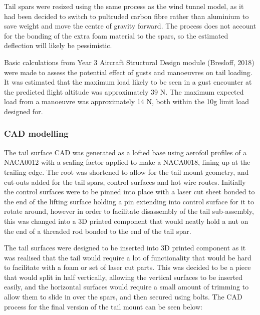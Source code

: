 \documentclass[../../main.tex]{subfiles}
\begin{document}
Tail spars were resized using the same process as the wind tunnel model, as it had been decided to switch to pultruded carbon fibre rather than aluminium to save weight and move the centre of gravity forward.
The process does not account for the bonding of the extra foam material to the spars, so the estimated deflection will likely be pessimistic.  

Basic calculations from Year 3 Aircraft Structural Design module (Bresloff, 2018) were made to assess the potential effect of gusts and manoeuvres on tail loading.
It was estimated that the maximum load likely to be seen in a gust encounter at the predicted flight altitude was approximately 39 N.
The maximum expected load from a manoeuvre was approximately 14 N, both within the 10g limit load designed for. 

\subsubsection{CAD modelling} \label{sec:design-process:final-design-proposal:tail:cad-modelling}

The tail surface CAD was generated as a lofted base using aerofoil profiles of a NACA0012 with a scaling factor applied to make a NACA0018, lining up at the trailing edge.
The root was shortened to allow for the tail mount geometry, and cut-outs added for the tail spars, control surfaces and hot wire routes.
Initially the control surfaces were to be pinned into place with a laser cut sheet bonded to the end of the lifting surface holding a pin extending into control surface for it to rotate around, however in order to facilitate disassembly of the tail sub-assembly, this was changed into a 3D printed component that would neatly hold a nut on the end of a threaded rod bonded to the end of the tail spar.

The tail surfaces were designed to be inserted into 3D printed component as it was realised that the tail would require a lot of functionality that would be hard to facilitate with a foam or set of laser cut parts.
This was decided to be a piece that would split in half vertically, allowing the vertical surfaces to be inserted easily, and the horizontal surfaces would require a small amount of trimming to allow them to slide in over the spars, and then secured using bolts.
The CAD process for the final version of the tail mount can be seen below:

\end{document}
